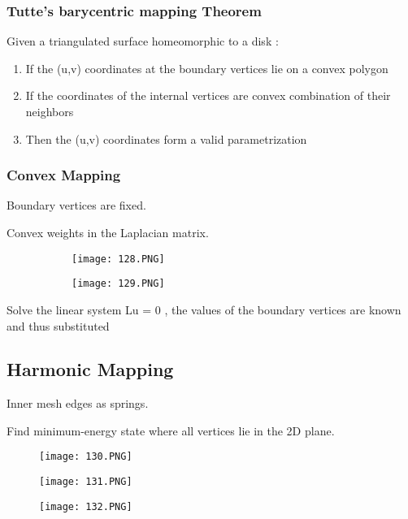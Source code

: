 \documentclass{article}
\begin{document}
\subsubsection{Tutte's barycentric mapping Theorem}

Given a triangulated surface homeomorphic to a disk :

\begin{enumerate}
    \item If the (u,v) coordinates at the boundary vertices lie on a convex polygon
    \item If the coordinates of the internal vertices are convex combination of their neighbors
    \item Then the (u,v) coordinates form a valid parametrization
\end{enumerate}

\subsubsection{Convex Mapping}


Boundary vertices are fixed.

Convex weights in the Laplacian matrix.

\begin{figure}[ht!]
  \centering
  \begin{subfigure}[b]{0.49\linewidth}
    \texttt{[image: 128.PNG]}
  \end{subfigure}
     \begin{subfigure}[b]{0.49\textwidth}
         \centering
         \texttt{[image: 129.PNG]}
     \end{subfigure}
\end{figure}

Solve the linear system Lu = 0 , the values of the boundary vertices are known and thus substituted

\subsection{Harmonic Mapping}

Inner mesh edges as springs.

Find minimum-energy state where all vertices lie in the 2D plane.

\begin{figure}[!htb]
  \texttt{[image: 130.PNG]}
  
\endminipage\hfill
{}
  \texttt{[image: 131.PNG]}
  
\endminipage\hfill
{}%
  \texttt{[image: 132.PNG]}

  
\endminipage
\end{figure}
\end{document}
